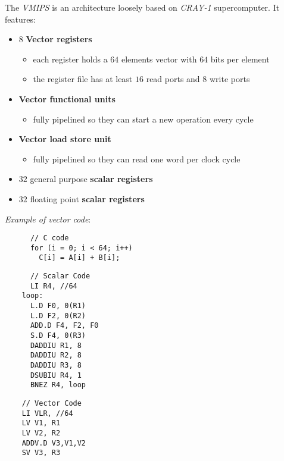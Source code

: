 \documentclass[english]{article}
\begin{document}
The \textit{VMIPS} is an architecture loosely based on \textit{CRAY-1} supercomputer.
It features:

\begin{itemize}
  \item \(8\) \textbf{Vector registers}
        \begin{itemize}
          \item each register holds a \(64\) elements vector with \(64\) bits per element
          \item the register file has at least \(16\) read ports and \(8\) write ports
        \end{itemize}
  \item \textbf{Vector functional units}
        \begin{itemize}
          \item fully pipelined so they can start a new operation every cycle
        \end{itemize}
  \item \textbf{Vector load store unit}
        \begin{itemize}
          \item fully pipelined so they can read one word per clock cycle
        \end{itemize}
  \item \(32\) general purpose \textbf{scalar registers}
  \item \(32\) floating point \textbf{scalar registers}
\end{itemize}

\bigskip
\textit{Example of vector code}:

\begin{minipage}{\textwidth}
  \bigskip
  \begin{minipage}[t]{0.33\textwidth}
    \begin{verbatim}
      // C code
      for (i = 0; i < 64; i++)
        C[i] = A[i] + B[i];
    \end{verbatim}
  \end{minipage}
  \begin{minipage}[t]{0.33\textwidth}
    \begin{verbatim}
      // Scalar Code
      LI R4, //64
    loop:
      L.D F0, 0(R1)
      L.D F2, 0(R2)
      ADD.D F4, F2, F0
      S.D F4, 0(R3)
      DADDIU R1, 8
      DADDIU R2, 8
      DADDIU R3, 8
      DSUBIU R4, 1
      BNEZ R4, loop
\end{verbatim}
  \end{minipage}
  \begin{minipage}[t]{0.33\textwidth}
    \begin{verbatim}
    // Vector Code
    LI VLR, //64
    LV V1, R1
    LV V2, R2
    ADDV.D V3,V1,V2
    SV V3, R3
  \end{verbatim}
  \end{minipage}
  \bigskip
\end{minipage}
\end{document}
